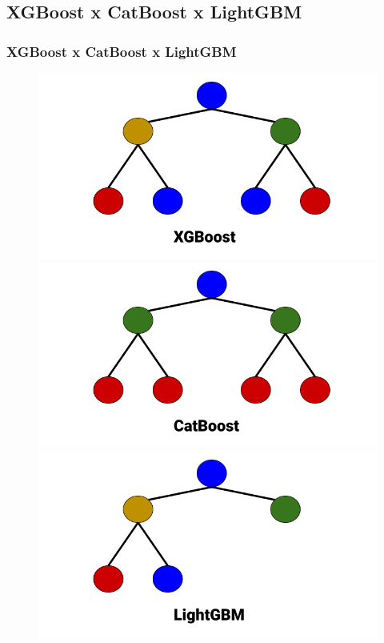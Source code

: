 \documentclass{beamer}
\begin{document}
\subsection{XGBoost x CatBoost x LightGBM}
\begin{frame}
\frametitle{XGBoost x CatBoost x LightGBM}
 \begin{figure}[h]
 \includegraphics[scale=0.2]{XGboost.png}
  \includegraphics[scale=0.2]{CatBoost.png}
   \includegraphics[scale=0.2]{LGBM.png}
\end{figure}
\end{frame}
\end{document}
